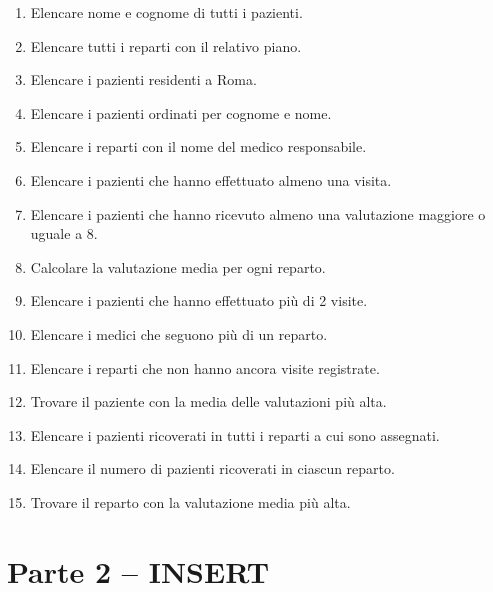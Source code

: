 \documentclass[a4paper,12pt]{article}
\begin{document}
	\begin{enumerate}
		
		\item Elencare nome e cognome di tutti i pazienti.
		
		\item Elencare tutti i reparti con il relativo piano.
		
		\item Elencare i pazienti residenti a Roma.
		
		\item Elencare i pazienti ordinati per cognome e nome.
		
		\item Elencare i reparti con il nome del medico responsabile.
		
		\item Elencare i pazienti che hanno effettuato almeno una visita.
		
		\item Elencare i pazienti che hanno ricevuto almeno una valutazione maggiore o uguale a 8.
		
		\item Calcolare la valutazione media per ogni reparto.
		
		\item Elencare i pazienti che hanno effettuato pi\`u di 2 visite.
		
		\item Elencare i medici che seguono pi\`u di un reparto.
		
		\item Elencare i reparti che non hanno ancora visite registrate.
		
		\item Trovare il paziente con la media delle valutazioni pi\`u alta.
		
		\item Elencare i pazienti ricoverati in tutti i reparti a cui sono assegnati.
		
		\item Elencare il numero di pazienti ricoverati in ciascun reparto.
		
		\item Trovare il reparto con la valutazione media pi\`u alta.
		
	\end{enumerate}
	
	
	\section*{Parte 2 -- INSERT}
	
\end{document}
